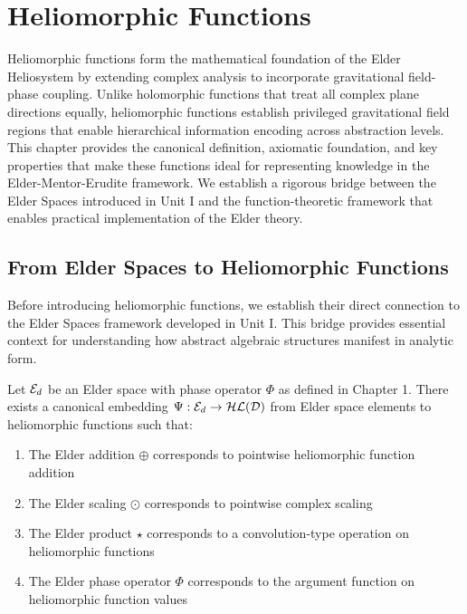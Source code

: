 \chapter{Heliomorphic Functions}

\begin{chapterabstract}
Heliomorphic functions form the mathematical foundation of the Elder Heliosystem by extending complex analysis to incorporate gravitational field-phase coupling. Unlike holomorphic functions that treat all complex plane directions equally, heliomorphic functions establish privileged gravitational field regions that enable hierarchical information encoding across abstraction levels. This chapter provides the canonical definition, axiomatic foundation, and key properties that make these functions ideal for representing knowledge in the Elder-Mentor-Erudite framework. We establish a rigorous bridge between the Elder Spaces introduced in Unit I and the function-theoretic framework that enables practical implementation of the Elder theory.
\end{chapterabstract}

\section{From Elder Spaces to Heliomorphic Functions}

Before introducing heliomorphic functions, we establish their direct connection to the Elder Spaces framework developed in Unit I. This bridge provides essential context for understanding how abstract algebraic structures manifest in analytic form.

\begin{theorem}
Let $\mathcal{E}_{d}$ be an Elder space with phase operator $\Phi$ as defined in Chapter 1. There exists a canonical embedding $\Psi: \mathcal{E}_{d} \rightarrow \mathcal{HL}(\mathcal{D})$ from Elder space elements to heliomorphic functions such that:
\begin{enumerate}
    \item The Elder addition $\oplus$ corresponds to pointwise heliomorphic function addition
    \item The Elder scaling $\odot$ corresponds to pointwise complex scaling
    \item The Elder product $\star$ corresponds to a convolution-type operation on heliomorphic functions
    \item The Elder phase operator $\Phi$ corresponds to the argument function on heliomorphic function values
\end{enumerate}
\end{theorem}

